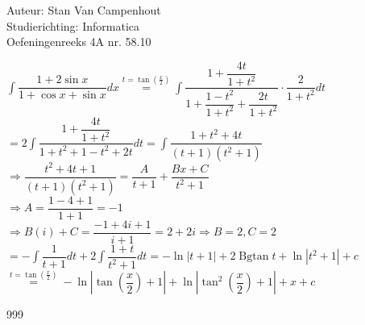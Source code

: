 \documentclass[a4paper]{article}
\begin{document}
  
\noindent \large Auteur: Stan Van Campenhout \\
\noindent \large Studierichting:  Informatica\\
\noindent \large Oefeningenreeks 4A nr. 58.10\\

\medskip

\normalsize

$ \displaystyle\int\dfrac{1+2\sin x}{1+\cos x+\sin x}dx \stackrel{t = \tan\left(\tfrac{x}{2}\right)}{=}
\displaystyle\int\dfrac{1+\dfrac{4t}{1+t^2}}{1+\dfrac{1-t^2}{1+t^2}+\dfrac{2t}{1+t^2}}\cdot\dfrac{2}{1+t^2}dt $\\

$ = 2\displaystyle\int\dfrac{1+\dfrac{4t}{1+t^2}}{1+t^2+1-t^2+2t}dt =\displaystyle\int\dfrac{1+t^2+4t}{\left(t+1\right)\left(t^2+1\right)} $\\

$ \Rightarrow \dfrac{t^2+4t+1}{\left(t+1\right)\left(t^2+1\right)} = \dfrac{A}{t+1}+\dfrac{Bx+C}{t^2+1} $\\

$ \Rightarrow A = \dfrac{1-4+1}{1+1} = -1 $\\

$ \Rightarrow B\left(i\right)+C = \dfrac{-1+4i+1}{i+1} = 2+2i \Rightarrow B = 2, C = 2 $\\

$ = -\displaystyle\int\dfrac{1}{t+1}dt + 2\displaystyle\int\dfrac{1+t}{t^2+1}dt =-\ln|t+1|+2\operatorname{Bgtan}t+\ln|t^2+1|+c $\\

$ \stackrel{t = \tan\left(\tfrac{x}{2}\right)}{=} -\ln\left|\tan\left(\dfrac{x}{2}\right) + 1\right|+\ln\left|\tan^2\left(\dfrac{x}{2}\right)+1\right|+x+c $\\

\begin{thebibliography}{999}
\end{thebibliography}
\end{document}
